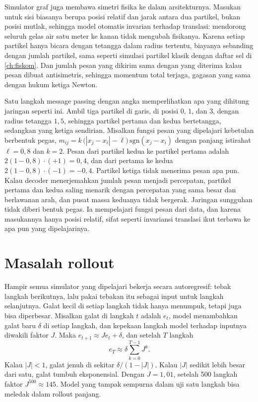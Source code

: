 Simulator graf juga membawa simetri fisika ke dalam arsitekturnya. Masukan untuk sisi biasanya berupa posisi relatif
dan jarak antara dua partikel, bukan posisi mutlak, sehingga model otomatis invarian terhadap translasi: mendorong
seluruh gelas air satu meter ke kanan tidak mengubah fisikanya. Karena setiap partikel hanya bicara dengan tetangga
dalam radius tertentu, biayanya sebanding dengan jumlah partikel, sama seperti simulasi partikel klasik dengan daftar
sel di \cref{ch:fiskom}. Dan jumlah pesan yang dikirim sama dengan yang diterima kalau pesan dibuat antisimetris,
sehingga momentum total terjaga, gagasan yang sama dengan hukum ketiga Newton.

Satu langkah message passing dengan angka memperlihatkan apa yang dihitung jaringan seperti ini. Ambil tiga partikel di
garis, di posisi $0$, $1$, dan $3$, dengan radius tetangga $1{,}5$, sehingga partikel pertama dan kedua bertetangga, sedangkan
yang ketiga sendirian. Misalkan fungsi pesan yang dipelajari kebetulan berbentuk pegas, $m_{ij}=k\,\big(|x_j-x_i|-\ell\big)\,\mathrm{sgn}(x_j-x_i)$ dengan
panjang istirahat $\ell=0{,}8$ dan $k=2$. Pesan dari partikel kedua ke partikel pertama adalah $2(1-0{,}8)\cdot(+1)=0{,}4$, dan dari
pertama ke kedua $2(1-0{,}8)\cdot(-1)=-0{,}4$. Partikel ketiga tidak menerima pesan apa pun. Kalau decoder menerjemahkan jumlah pesan menjadi
percepatan, partikel pertama dan kedua saling menarik dengan percepatan yang sama besar dan berlawanan arah, dan pusat
massa keduanya tidak bergerak. Jaringan sungguhan tidak diberi bentuk pegas. Ia mempelajari fungsi pesan dari data, dan
karena masukannya hanya posisi relatif, sifat seperti invariansi translasi ikut terbawa ke apa pun yang dipelajarinya.

\section{Masalah rollout}

Hampir semua simulator yang dipelajari bekerja secara autoregresif: tebak langkah berikutnya, lalu
pakai tebakan itu sebagai input untuk langkah selanjutnya. Galat kecil di setiap langkah tidak hanya
menumpuk, tetapi juga bisa diperbesar. Misalkan galat di langkah $t$ adalah $e_t$, model menambahkan galat
baru $\delta$ di setiap langkah, dan kepekaan langkah model terhadap inputnya diwakili faktor $J$. Maka
$e_{t+1}\approx Je_t+\delta$, dan setelah $T$ langkah
\begin{equation}
e_T\approx\delta\sum_{k=0}^{T-1}J^k.
\end{equation}
Kalau $|J|<1$, galat jenuh di sekitar $\delta/(1-|J|)$. Kalau $|J|$ sedikit lebih besar dari satu,
galat tumbuh eksponensial. Dengan $J=1{,}01$, setelah 500 langkah faktor $J^{500}\approx145$. Model yang
tampak sempurna dalam uji satu langkah bisa meledak dalam rollout panjang.

